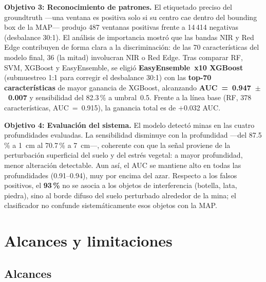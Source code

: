 \textbf{Objetivo 3: Reconocimiento de patrones.}
El etiquetado preciso del groundtruth ---una ventana es positiva solo si su centro
cae dentro del bounding box de la \ac{MAP}--- produjo 487 ventanas positivas frente
a 14\,414 negativas (desbalance 30:1). El análisis de importancia mostró que las
bandas \ac{NIR} y Red Edge contribuyen de forma clara a la discriminación: de las
70 características del modelo final, 36 (la mitad) involucran \ac{NIR} o Red Edge. Tras comparar \ac{RF},
\ac{SVM}, XGBoost y EasyEnsemble, se eligió \textbf{EasyEnsemble~x10 XGBoost}
(submuestreo 1:1 para corregir el desbalance 30:1) con las \textbf{top-70
características} de mayor ganancia de XGBoost, alcanzando
\textbf{AUC~=~0.947~$\pm$~0.007} y sensibilidad del 82.3\,\% a umbral~0.5. Frente a
la línea base (\ac{RF}, 378 características, AUC~=~0.915), la ganancia total es de
$+$0.032 AUC.

\textbf{Objetivo 4: Evaluación del sistema.}
El modelo detectó minas en las cuatro profundidades evaluadas. La sensibilidad
disminuye con la profundidad ---del 87.5\,\% a \SI{1}{cm} al 70.7\,\% a
\SI{7}{cm}---, coherente con que la señal proviene de la perturbación superficial
del suelo y del estrés vegetal: a mayor profundidad, menor alteración detectable.
Aun así, el \ac{AUC} se mantiene alto en todas las profundidades (0.91--0.94), muy
por encima del azar. Respecto a los falsos positivos, el \textbf{93\,\%} no se
asocia a los objetos de interferencia (botella, lata, piedra), sino al borde
difuso del suelo perturbado alrededor de la mina; el clasificador no confunde
sistemáticamente esos objetos con la \ac{MAP}.

\section{Alcances y limitaciones}

\subsection{Alcances}

